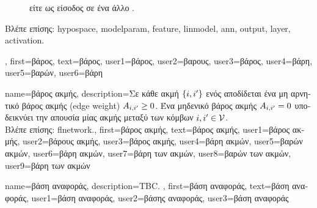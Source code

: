 {{\begin{figure}[H]
{{			 \foreignlanguage{greek}{είτε ως είσοδος σε ένα άλλο} . \label{fig_weights_dict}} }
		\end{figure}
		\foreignlanguage{greek}{Βλέπε επίσης:} \gls{hypospace}, \gls{modelparam}, \gls{feature}, \gls{linmodel}, \gls{ann}, \gls{output}, \gls{layer}, 
		\gls{activation}.},
	first={\foreignlanguage{greek}{βάρος}},
	text={\foreignlanguage{greek}{βάρος}},
	user1={\foreignlanguage{greek}{βάρος}}, %
	user2={\foreignlanguage{greek}{βαρους}}, %
	user3={\foreignlanguage{greek}{βάρος}}, %
	user4={\foreignlanguage{greek}{βάρη}}, %
	user5={\foreignlanguage{greek}{βαρών}}, %
	user6={\foreignlanguage{greek}{βάρη}} %
}

{name={\foreignlanguage{greek}{βάρος ακμής}},
	description={\foreignlanguage{greek}{Σε κάθε ακμή $\{i,i'\}$ ενός} 
		 \foreignlanguage{greek}{αποδίδεται ένα μη αρνητικό βάρος ακμής} (edge weight)  
		$A_{i,i'}\geq0$. \foreignlanguage{greek}{Ένα μηδενικό βάρος ακμής $A_{i,i'}=0$ 
		υποδεικνύει την απουσία μίας ακμής μεταξύ των κόμβων} $i, i' \in \mathcal{V}$.
		\\
		\foreignlanguage{greek}{Βλέπε επίσης:} \gls{flnetwork}.}, 
	first={\foreignlanguage{greek}{βάρος ακμής}},
	text={\foreignlanguage{greek}{βάρος ακμής}},
	user1={\foreignlanguage{greek}{βάρος ακμής}}, %
	user2={\foreignlanguage{greek}{βάρους ακμής}}, %
	user3={\foreignlanguage{greek}{βάρος ακμής}}, %
	user4={\foreignlanguage{greek}{βάρη ακμών}}, %
	user5={\foreignlanguage{greek}{βαρών ακμών}}, %
	user6={\foreignlanguage{greek}{βάρη ακμών}}, %
	user7={\foreignlanguage{greek}{βάρη των ακμών}}, %
	user8={\foreignlanguage{greek}{βαρών των ακμών}}, %
	user9={\foreignlanguage{greek}{βάρη των ακμών}} %
}

{name={\foreignlanguage{greek}{βάση αναφοράς}},
	description={TBC. },
    first={\foreignlanguage{greek}{βάση αναφοράς}},
    text={\foreignlanguage{greek}{βάση αναφοράς}},
    user1={\foreignlanguage{greek}{βάση αναφοράς}}, %
    user2={\foreignlanguage{greek}{βάσης αναφοράς}}, %
    user3={\foreignlanguage{greek}{βάση αναφοράς}} %
}

